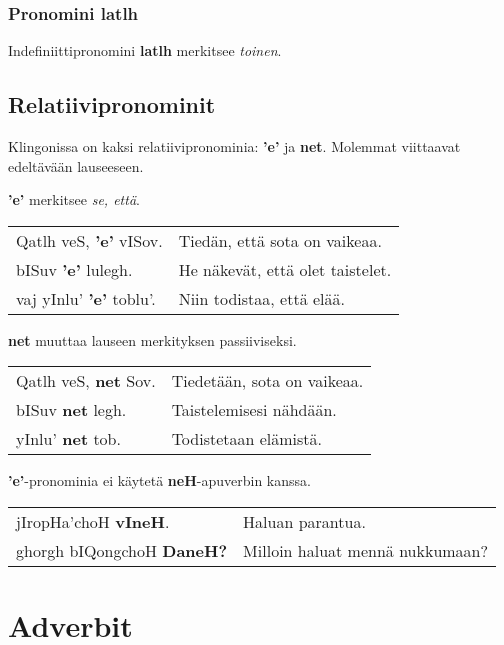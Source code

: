 \documentclass{book}
\begin{document}
\subsection{Pronomini latlh}

Indefiniittipronomini \textbf{latlh} merkitsee \textit{toinen}.

\section{Relatiivipronominit}

Klingonissa on kaksi relatiivipronominia: \textbf{'e'} ja \textbf{net}.
Molemmat viittaavat edeltävään lauseeseen.

\textbf{'e'} merkitsee \textit{se, että}.

\begin{tabular}{l l}
    Qatlh veS, \textbf{'e'} vISov. & Tiedän, että sota on vaikeaa. \\
    bISuv \textbf{'e'} lulegh. & He näkevät, että olet taistelet. \\
    vaj yInlu' \textbf{'e'} toblu'. & Niin todistaa, että elää. \\
\end{tabular}

\textbf{net} muuttaa lauseen merkityksen passiiviseksi.

\begin{tabular}{l l}
    Qatlh veS, \textbf{net} Sov. & Tiedetään, sota on vaikeaa. \\
    bISuv \textbf{net} legh. & Taistelemisesi nähdään. \\
    yInlu' \textbf{net} tob. & Todistetaan elämistä. \\
\end{tabular}

\textbf{'e'}-pronominia ei käytetä \textbf{neH}-apuverbin kanssa.

\begin{tabular}{l l}
    jIropHa'choH \textbf{vIneH}. & Haluan parantua. \\
    ghorgh bIQongchoH \textbf{DaneH?} & Milloin haluat mennä nukkumaan? \\
\end{tabular}

\chapter{Adverbit}
\end{document}
